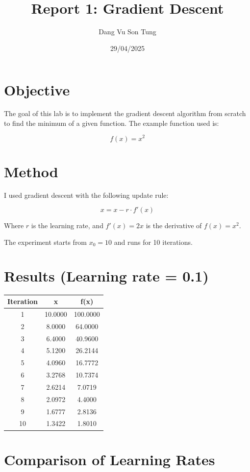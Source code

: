 \documentclass{article}
\title{Report 1: Gradient Descent}
\author{Dang Vu Son Tung}
\date{29/04/2025}
\begin{document}
\maketitle

\section*{Objective}
The goal of this lab is to implement the gradient descent algorithm from scratch to find the minimum of a given function. The example function used is: 

\[
f(x) = x^2
\]

\section*{Method}
I used gradient descent with the following update rule:

\[
x = x - r \cdot f'(x)
\]

Where \( r \) is the learning rate, and \( f'(x) = 2x \) is the derivative of \( f(x) = x^2 \).

The experiment starts from \( x_0 = 10 \) and runs for 10 iterations.

\section*{Results (Learning rate = 0.1)}

\begin{center}
\begin{tabular}{|c|c|c|}
\hline
Iteration & x & f(x) \\
\hline
1 & 10.0000 & 100.0000 \\
2 & 8.0000 & 64.0000 \\
3 & 6.4000 & 40.9600 \\
4 & 5.1200 & 26.2144 \\
5 & 4.0960 & 16.7772 \\
6 & 3.2768 & 10.7374 \\
7 & 2.6214 & 7.0719 \\
8 & 2.0972 & 4.4000 \\
9 & 1.6777 & 2.8136 \\
10 & 1.3422 & 1.8010 \\
\hline
\end{tabular}
\end{center}

\section*{Comparison of Learning Rates}
\end{document}
